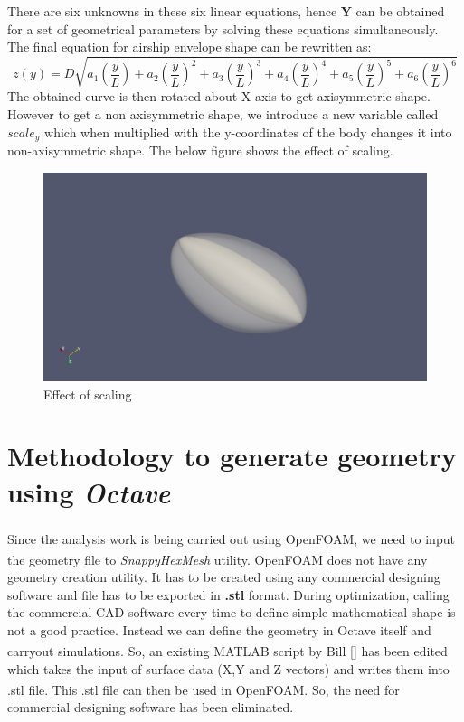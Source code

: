 There are six unknowns in these six linear equations, hence $\bm{Y}$ can be obtained for a set of geometrical parameters by solving these equations simultaneously. The final equation for airship envelope shape can be rewritten as:
\begin{equation}
\label{eq28}
z(y) = D\sqrt{a_1\left(\dfrac{y}{L}\right) + a_2\left(\dfrac{y}{L}\right)^2 + a_3\left(\dfrac{y}{L}\right)^3 + a_4\left(\dfrac{y}{L}\right)^4 + a_5\left(\dfrac{y}{L}\right)^5 +  a_6\left(\dfrac{y}{L}\right)^6}	
\end{equation}
The obtained curve is then rotated about X-axis to get axisymmetric shape. However to get a non axisymmetric shape, we introduce a new variable called $ scale_y $ which when multiplied with the y-coordinates of the body changes it into non-axisymmetric shape. The below figure shows the effect of scaling.
\begin{figure}[htbp]
	\centering
	\includegraphics[width=200 pt]{rnd/effect_of_scaling.png}
	\caption{Effect of scaling }
	\label{Effect of scaling}
\end{figure}


\section{Methodology to generate geometry using \textit{Octave}}

Since the analysis work is being carried out using OpenFOAM\textsuperscript{\textregistered}, we need to input the geometry file to \textit{SnappyHexMesh} utility. OpenFOAM\textsuperscript{\textregistered} does not have any geometry creation utility. It has to be created using any commercial designing software and file has to be exported in \textbf{.stl} format. During optimization, calling the commercial CAD software every time to define simple mathematical shape is not a good practice. Instead we can define the geometry in Octave itself and carryout simulations. So, an existing MATLAB\textsuperscript{\textregistered} script by Bill [] has been edited which takes the input of surface data  (X,Y and Z vectors) and writes them into .stl file. This .stl file can then be used in OpenFOAM\textsuperscript{\textregistered}. So, the need for commercial designing software has been eliminated.
